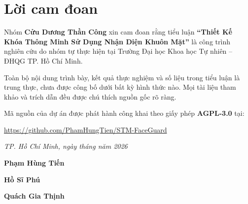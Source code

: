 \chapter*{Lời cam đoan}
\thispagestyle{plain}

\begin{singlespace}
Nhóm \textbf{Cửu Dương Thần Công} xin cam đoan rằng tiểu luận \textbf{``Thiết Kế Khóa Thông Minh Sử Dụng Nhận Diện Khuôn Mặt''} là công trình nghiên cứu do nhóm tự thực hiện tại Trường Đại học Khoa học Tự nhiên -- ĐHQG TP. Hồ Chí Minh.

Toàn bộ nội dung trình bày, kết quả thực nghiệm và số liệu trong tiểu luận là trung thực, chưa được công bố dưới bất kỳ hình thức nào. Mọi tài liệu tham khảo và trích dẫn đều được chú thích nguồn gốc rõ ràng.

Mã nguồn của dự án được phát hành công khai theo giấy phép \textbf{AGPL-3.0} tại:
\begin{center}
  \url{https://github.com/PhamHungTien/STM-FaceGuard}
\end{center}
\end{singlespace}

\vspace{1.0cm}
\begin{flushright}
  \textit{TP. Hồ Chí Minh, ngày \underline{\phantom{00}} tháng \underline{\phantom{00}} năm 2026}
\end{flushright}

\vspace{1.0cm}
\noindent\hfill
\begin{minipage}[t]{4.0cm}\centering
  \textbf{Phạm Hùng Tiến}\\[2.0cm]
  \underline{\hspace{3.5cm}}
\end{minipage}%
\hfill
\begin{minipage}[t]{4.0cm}\centering
  \textbf{Hồ Sĩ Phú}\\[2.0cm]
  \underline{\hspace{3.5cm}}
\end{minipage}%
\hfill
\begin{minipage}[t]{4.0cm}\centering
  \textbf{Quách Gia Thịnh}\\[2.0cm]
  \underline{\hspace{3.5cm}}
\end{minipage}
\hfill\null
